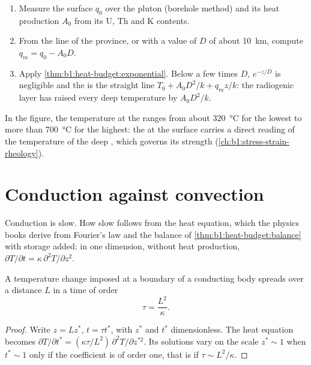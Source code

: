 \begin{method}\label{met:b1:heat-budget:moho}
\begin{enumerate}
  \item Measure the surface  $q_0$ over the pluton (borehole method)
        and its heat production $A_0$ from its U, Th and K contents.
  \item From the line of the province, or with a value of $D$ of about
        \qty{10}{km}, compute $q_m = q_0 - A_0 D$.
  \item Apply \cref{thm:b1:heat-budget:exponential}. Below a few times $D$,
        $e^{-z/D}$ is negligible and the  is the straight line
        $T_0 + A_0D^2/k + q_m z/k$: the radiogenic layer has raised every deep
        temperature by $A_0D^2/k$.
\end{enumerate}
\end{method}

In the figure, the temperature at the  ranges from about \qty{320}{\degreeCelsius}
for the lowest  to more than \qty{700}{\degreeCelsius} for the highest: the  at the surface carries a direct reading of the
temperature of the deep , which governs its strength
(\cref{ch:b1:stress-strain-rheology}).

\section{Conduction against convection}

Conduction is slow. How slow follows from the heat equation, which the physics
books derive from Fourier's law and the balance of
\cref{thm:b1:heat-budget:balance} with storage added: in one dimension, without
heat production,
$\partial T/\partial t = \kappa\,\partial^2 T/\partial z^2$.

\begin{proposition}\label{prop:b1:heat-budget:timescale}
A temperature change imposed at a boundary of a conducting body spreads over a
distance $L$ in a time of order
\[
  \tau = \frac{L^2}{\kappa} .
\]
\end{proposition}

\begin{proof}
Write $z = L z^*$, $t = \tau t^*$, with $z^*$ and $t^*$ dimensionless. The heat
equation becomes $\partial T/\partial t^* = (\kappa\tau/L^2)\,\partial^2
T/\partial z^{*2}$. Its solutions vary on the scale $z^* \sim 1$ when $t^* \sim 1$
only if the coefficient is of order one, that is if $\tau \sim L^2/\kappa$.
\end{proof}

